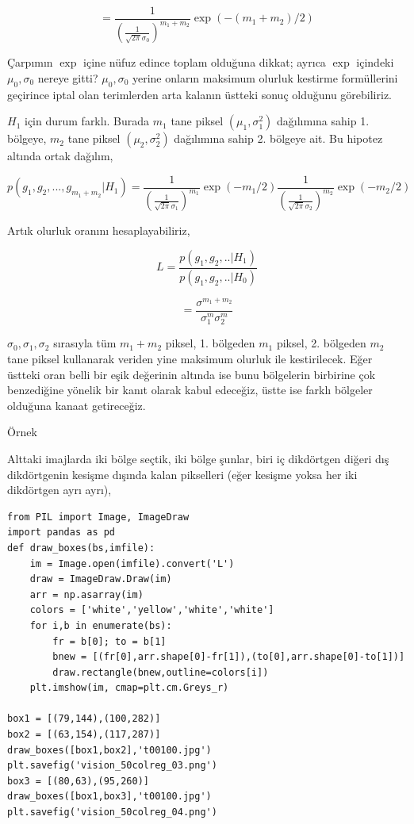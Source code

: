 \documentclass[12pt,fleqn]{article}\usepackage{../../common}
\begin{document}
$$= \frac{1}{ (\frac{1}{\sqrt{2\pi} \sigma_0})^{m_1+m_2} } \exp (- (m_1+m_2) / 2)$$

Çarpımın $\exp$ içine nüfuz edince toplam olduğuna dikkat; ayrıca $\exp$
içindeki $\mu_0,\sigma_0$ nereye gitti? $\mu_0,\sigma_0$ yerine onların maksimum
olurluk kestirme formüllerini geçirince iptal olan terimlerden arta kalanın
üstteki sonuç olduğunu görebiliriz.

$H_1$ için durum farklı. Burada $m_1$ tane piksel $(\mu_1,\sigma_1^2)$
dağılımına sahip 1. bölgeye, $m_2$ tane piksel $(\mu_2,\sigma_2^2)$ dağılımına
sahip 2. bölgeye ait. Bu hipotez altında ortak dağılım,

$$
p(g_1,g_2,...,g_{m_1+m_2} | H_1) =
\frac{1}{ (\frac{1}{\sqrt{2\pi} \sigma_1})^{m_1} } \exp (- m_1/2)
\frac{1}{ (\frac{1}{\sqrt{2\pi} \sigma_2})^{m_2} } \exp (- m_2/2)
$$

Artık olurluk oranını hesaplayabiliriz,

$$ L = \frac{p(g_1,g_2,.. | H_1)}{p(g_1,g_2,.. | H_0)}$$

$$ = \frac{\sigma^{m_1+m_2}}{\sigma^m_1 \sigma^m_2} $$

$\sigma_0, \sigma_1 , \sigma_2$ sırasıyla tüm $m_1+m_2$ piksel, 1. bölgeden
$m_1$ piksel, 2. bölgeden $m_2$ tane piksel kullanarak veriden yine maksimum
olurluk ile kestirilecek. Eğer üstteki oran belli bir eşik değerinin altında ise
bunu bölgelerin birbirine çok benzediğine yönelik bir kanıt olarak kabul
edeceğiz, üstte ise farklı bölgeler olduğuna kanaat getireceğiz.

Örnek

Alttaki imajlarda iki bölge seçtik, iki bölge şunlar, biri iç dikdörtgen diğeri
dış dikdörtgenin kesişme dışında kalan pikselleri (eğer kesişme yoksa her iki
dikdörtgen ayrı ayrı),

\begin{verbatim}
from PIL import Image, ImageDraw
import pandas as pd
def draw_boxes(bs,imfile):
    im = Image.open(imfile).convert('L')
    draw = ImageDraw.Draw(im)
    arr = np.asarray(im)
    colors = ['white','yellow','white','white']
    for i,b in enumerate(bs):
        fr = b[0]; to = b[1]
        bnew = [(fr[0],arr.shape[0]-fr[1]),(to[0],arr.shape[0]-to[1])]
        draw.rectangle(bnew,outline=colors[i])
    plt.imshow(im, cmap=plt.cm.Greys_r)

box1 = [(79,144),(100,282)]
box2 = [(63,154),(117,287)]
draw_boxes([box1,box2],'t00100.jpg')
plt.savefig('vision_50colreg_03.png')
box3 = [(80,63),(95,260)]
draw_boxes([box1,box3],'t00100.jpg')
plt.savefig('vision_50colreg_04.png')
\end{verbatim}
\end{document}
